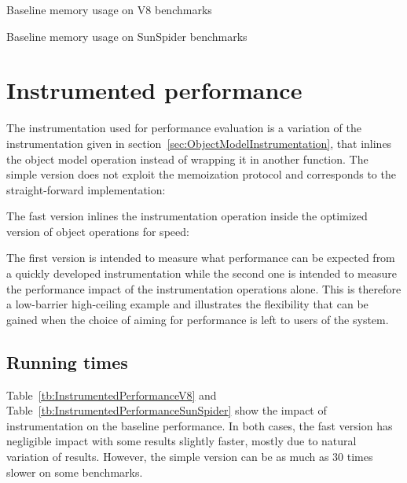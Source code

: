 \begin{table}[htb]
\caption{Baseline memory usage on V8 benchmarks}
\centering
    
\label{tb:BaselineMemoryV8}
\end{table}

\begin{table}[htb]
\caption{Baseline memory usage on SunSpider benchmarks}
\centering
    
\label{tb:BaselineMemorySunSpider}
\end{table}

\newpage
\section{Instrumented performance}
\label{sec:InstrumentedPerformance}

The instrumentation used for performance evaluation is a variation of the
instrumentation given in section~\ref{sec:ObjectModelInstrumentation}, that
inlines the object model operation instead of wrapping it in another function. 
The simple version does not exploit the memoization protocol and
corresponds to the straight-forward implementation:


The fast version inlines the instrumentation operation inside the optimized
version of object operations for speed:

\newpage
{}



The first version is intended to measure what performance can be expected from a
quickly developed instrumentation while the second one is intended to measure
the performance impact of the instrumentation operations alone. This is
therefore a low-barrier high-ceiling example and illustrates the flexibility
that can be gained when the choice of aiming for performance is left to users
of the system.

\subsection{Running times}

Table~\ref{tb:InstrumentedPerformanceV8} and
Table~\ref{tb:InstrumentedPerformanceSunSpider} show the impact of
instrumentation on the baseline performance. In both cases, the fast version has
negligible impact with some results slightly faster, mostly due to natural
variation of results.  However, the simple version can be as much as 30 times
slower on some benchmarks.

